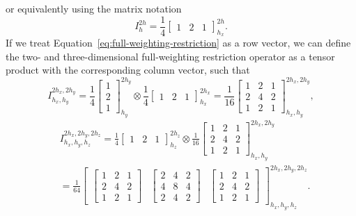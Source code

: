 or equivalently using the matrix notation
\begin{equation}
	I_{h}^{2h} =  \frac{1}{4} \begin{bmatrix}
			1 & 2 & 1
		\end{bmatrix}_{h_x}^{2h}.
	\label{eq:full-weighting-restriction}
\end{equation} 
If we treat Equation~\eqref{eq:full-weighting-restriction} as a row vector, we can define the two- and three-dimensional full-weighting restriction operator as a tensor product with the corresponding column vector, such that
\begin{equation}
	I^{2h_x, 2h_y}_{h_x, h_y} = \frac{1}{4} \begin{bmatrix}
		1 \\ 2 \\ 1
	\end{bmatrix}_{h_y}^{2h_y} \otimes \frac{1}{4} \begin{bmatrix}
		1 & 2 & 1
	\end{bmatrix}_{h_x}^{2h_x} =
\frac{1}{16} 
\begin{bmatrix}
	1 & 2 & 1 \\
	2 & 4 & 2 \\
	1 & 2 & 1
\end{bmatrix}^{2h_x, 2h_y}_{h_x, h_y},
\end{equation} 
\begin{equation}
\begin{split}
	& I^{2h_x, 2h_y, 2h_z}_{h_x, h_y, h_z} = \frac{1}{4} \begin{bmatrix}
		1 & 2 & 1
	\end{bmatrix}_{h_z}^{2h_z} \otimes 
	\frac{1}{16} 
	\begin{bmatrix}
		1 & 2 & 1 \\
		2 & 4 & 2 \\
		1 & 2 & 1
	\end{bmatrix}^{2h_x, 2h_y}_{h_x, h_y} \\
& = \frac{1}{64} \begin{bmatrix}
\begin{bmatrix}
	1 & 2 & 1 \\
	2 & 4 & 2 \\
	1 & 2 & 1
\end{bmatrix} &	\begin{bmatrix}
2 & 4 & 2 \\
4 & 8 & 4 \\
2 & 4 & 2
\end{bmatrix} &
\begin{bmatrix}
	1 & 2 & 1 \\
	2 & 4 & 2 \\
	1 & 2 & 1
\end{bmatrix}
\end{bmatrix}^{2h_x, 2h_y, 2h_z}_{h_x, h_y, h_z}.
\end{split}
\end{equation}
